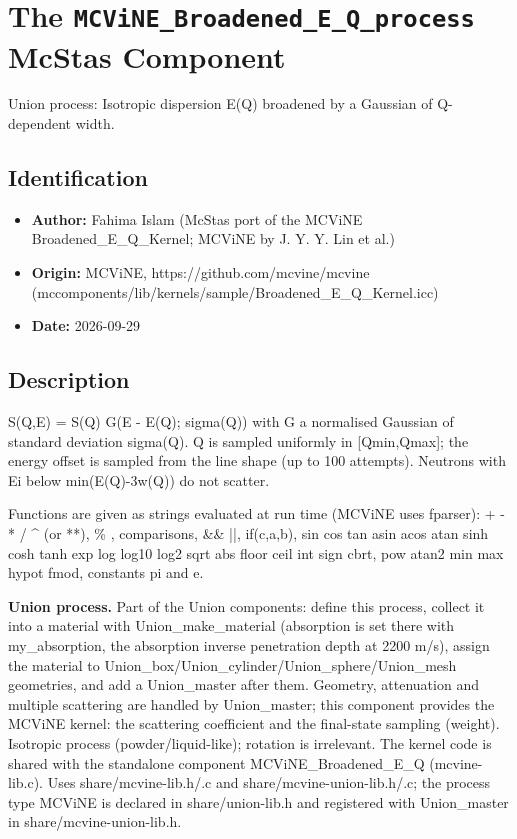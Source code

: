 \section{The \texttt{MCViNE\_Broadened\_E\_Q\_process} McStas Component}
Union process: Isotropic dispersion E(Q) broadened by a Gaussian of Q-dependent width.

\subsection*{Identification}
\begin{itemize}
  \item \textbf{Author:} Fahima Islam (McStas port of the MCViNE Broadened\_E\_Q\_Kernel; MCViNE by J. Y. Y. Lin et al.)
  \item \textbf{Origin:} MCViNE, https://github.com/mcvine/mcvine (mccomponents/lib/kernels/sample/Broadened\_E\_Q\_Kernel.icc)
  \item \textbf{Date:} 2026-09-29
\end{itemize}

\subsection*{Description}
S(Q,E) = S(Q) G(E - E(Q); sigma(Q)) with G a normalised Gaussian of standard deviation sigma(Q). Q is sampled uniformly in [Qmin,Qmax]; the energy offset is sampled from the line shape (up to 100 attempts). Neutrons with Ei below min(E(Q)-3w(Q)) do not scatter.

Functions are given as strings evaluated at run time (MCViNE uses fparser): + - * / \textasciicircum{} (or **), \% , comparisons, \&\& ||, if(c,a,b), sin cos tan asin acos atan sinh cosh tanh exp log log10 log2 sqrt abs floor ceil int sign cbrt, pow atan2 min max hypot fmod, constants pi and e.

\textbf{Union process.} Part of the Union components: define this process, collect it into a material with Union\_make\_material (absorption is set there with my\_absorption, the absorption inverse penetration depth at 2200 m/s), assign the material to Union\_box/Union\_cylinder/Union\_sphere/Union\_mesh geometries, and add a Union\_master after them. Geometry, attenuation and multiple scattering are handled by Union\_master; this component provides the MCViNE kernel: the scattering coefficient and the final-state sampling (weight). Isotropic process (powder/liquid-like); rotation is irrelevant. The kernel code is shared with the standalone component MCViNE\_Broadened\_E\_Q (mcvine-lib.c). Uses share/mcvine-lib.h/.c and share/mcvine-union-lib.h/.c; the process type MCViNE is declared in share/union-lib.h and registered with Union\_master in share/mcvine-union-lib.h.

